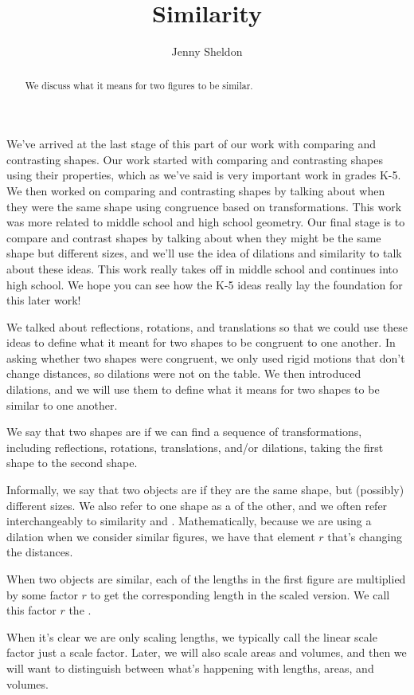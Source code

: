 \documentclass{ximera}
\title{Similarity}
\author{Jenny Sheldon}
\begin{document}
\begin{abstract}
We discuss what it means for two figures to be similar.
\end{abstract}
\maketitle

We've arrived at the last stage of this part of our work with comparing and contrasting shapes. Our work started with comparing and contrasting shapes using their properties, which as we've said is very important work in grades K-5. We then worked on comparing and contrasting shapes by talking about when they were the same shape using congruence based on transformations. This work was more related to middle school and high school geometry. Our final stage is to compare and contrast shapes by talking about when they might be the same shape but different sizes, and we'll use the idea of dilations and similarity to talk about these ideas. This work really takes off in middle school and continues into high school. We hope you can see how the K-5 ideas really lay the foundation for this later work!

We talked about reflections, rotations, and translations so that we could use these ideas to define what it meant for two shapes to be congruent to one another. In asking whether two shapes were congruent, we only used rigid motions that don't change distances, so dilations were not on the table. We then introduced dilations, and we will use them to define what it means for two shapes to be similar to one another.
\begin{definition}
We say that two shapes are  if we can find a sequence of transformations, including reflections, rotations, translations, and/or dilations, taking the first shape to the second shape.
\end{definition}
Informally, we say that two objects are  if they are the same shape, but (possibly) different sizes. We also refer to one shape as a  of the other, and we often refer interchangeably to similarity and . Mathematically, because we are using a dilation when we consider similar figures, we have that element $r$ that's changing the distances.
\begin{definition}
When two objects are similar, each of the lengths in the first figure are multiplied by some factor $r$ to get the corresponding length in the scaled version. We call this factor $r$ the .
\end{definition}
When it's clear we are only scaling lengths, we typically call the linear scale factor just a scale factor. Later, we will also scale areas and volumes, and then we will want to distinguish between what's happening with lengths, areas, and volumes.
\end{document}
